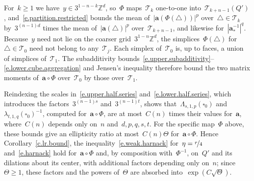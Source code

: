 \documentclass[11pt,letterpaper]{article}
\numberwithin{equation}{section}
\theoremstyle{definition}
\newcommand{\Zd}{\mathbb{Z}^d}
\renewcommand{\a}{\mathbf{a}}
\newcommand{\nf}{\nicefrac}
\newcommand{\cu}{\square}
\begin{document}
For~$k\geq1$ we have~$y\in3^{1-n-k}\Zd$, so~$\Phi$ maps~$\mathscr T_k$ one-to-one into~$\mathscr T_{k+n-1}(Q')$, and~\eqref{e.partition.restricted} bounds the mean of~$|\a(\Phi(\triangle))|^p$ over~$\triangle\in\mathscr T_k$ by~$3^{(n-1)d}$ times the mean of~$|\a(\triangle)|^p$ over~$\mathscr T_{k+n-1}$, and likewise for~$|\a_*^{-1}|^q$. Because~$y$ need not lie on the coarser grid~$3^{1-n}\Zd$, the simplices~$\Phi(\triangle)$ for~$\triangle\in\mathscr T_0$ need not belong to any~$\mathscr T_j$. Each simplex of~$\mathscr T_0$ is, up to faces, a union of simplices of~$\mathscr T_1$. The subadditivity bounds~\eqref{e.upper.subadditivity}--\eqref{e.lower.cube.aggregation} and Jensen's inequality therefore bound the two matrix moments of~$\a\circ\Phi$ over~$\mathscr T_0$ by those over~$\mathscr T_1$.

Reindexing the scales in~\eqref{e.upper.half.series} and~\eqref{e.lower.half.series}, which introduces the factors~$3^{(n-1)s}$ and~$3^{(n-1)t}$, shows that~$\Lambda_{s,1,p}(\cu_0)$ and~$\lambda_{t,1,q}(\cu_0)^{-1}$, computed for~$\a\circ\Phi$, are at most~$C(n)$ times their values for~$\a$, where~$C(n)$ depends only on~$n$ and~$d,p,q,s,t$. For the specific map~$\Phi$ above, these bounds give an ellipticity ratio at most~$C(n)\Theta$ for~$\a\circ\Phi$. Hence Corollary~\ref{c.lr.bound}, the inequality~\eqref{e.weak.harnack} for~$\eta=\nf r4$ and~\eqref{e.harnack} hold for~$\a\circ\Phi$ and, by composition with~$\Phi^{-1}$, on~$Q'$ and its dilations about its center, with additional factors depending only on~$n$; since~$\Theta\geq1$, these factors and the powers of~$\Theta$ are absorbed into~$\exp(C\sqrt\Theta)$.

\smallskip
\end{document}
